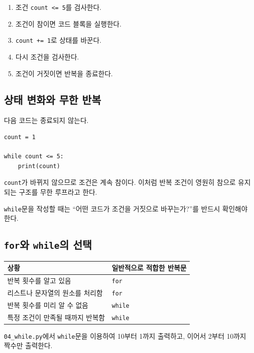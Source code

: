\documentclass[11pt,a4paper]{article}
\begin{document}
\begin{enumerate}
    \item 조건 \texttt{count <= 5}를 검사한다.
    \item 조건이 참이면 코드 블록을 실행한다.
    \item \texttt{count += 1}로 상태를 바꾼다.
    \item 다시 조건을 검사한다.
    \item 조건이 거짓이면 반복을 종료한다.
\end{enumerate}

\subsection{상태 변화와 무한 반복}

다음 코드는 종료되지 않는다.

\begin{lstlisting}
count = 1

while count <= 5:
    print(count)
\end{lstlisting}

\texttt{count}가 바뀌지 않으므로 조건은 계속 참이다. 이처럼 반복 조건이 영원히 참으로 유지되는 구조를 무한 루프라고 한다.

\begin{importantbox}
\texttt{while}문을 작성할 때는 ``어떤 코드가 조건을 거짓으로 바꾸는가?''를 반드시 확인해야 한다.
\end{importantbox}

\subsection{\texttt{for}와 \texttt{while}의 선택}

\begin{center}
\begin{tabular}{ll}
\toprule
상황 & 일반적으로 적합한 반복문 \\
\midrule
반복 횟수를 알고 있음 & \texttt{for} \\
리스트나 문자열의 원소를 처리함 & \texttt{for} \\
반복 횟수를 미리 알 수 없음 & \texttt{while} \\
특정 조건이 만족될 때까지 반복함 & \texttt{while} \\
\bottomrule
\end{tabular}
\end{center}

\begin{practicebox}
\texttt{04\_while.py}에서 \texttt{while}문을 이용하여 10부터 1까지 출력하고, 이어서 2부터 10까지 짝수만 출력한다.
\end{practicebox}
\end{document}
